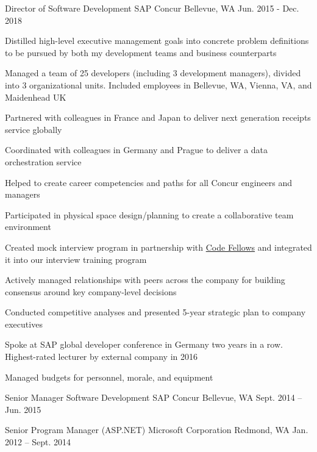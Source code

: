 \begin{cventries}

\cventry
{Director of Software Development}
{SAP Concur}
{Bellevue, WA}
{Jun. 2015 - Dec. 2018}
{
  \begin{cvitems}
  \item {Distilled high-level executive management goals into concrete problem definitions to be pursued by both my development teams and business counterparts}
  \item {Managed a team of 25 developers (including 3 development managers), divided into 3 organizational units. Included employees in Bellevue, WA, Vienna, VA, and Maidenhead UK}
  \item {Partnered with colleagues in France and Japan to deliver next generation receipts service globally}
  \item {Coordinated with colleagues in Germany and Prague to deliver a data orchestration service}
  \item {Helped to create career competencies and paths for all Concur engineers and managers}
  \item {Participated in physical space design/planning to create a collaborative team environment}
  \item {Created mock interview program in partnership with \href{https://www.codefellows.org/}{Code Fellows} and integrated it into our interview training program}
  \item {Actively managed relationships with peers across the company for building consensus around key company-level decisions}
  \item {Conducted competitive analyses and presented 5-year strategic plan to company executives}
  \item {Spoke at SAP global developer conference in Germany two years in a row. Highest-rated lecturer by external company in 2016}
  \item {Managed budgets for personnel, morale, and equipment}
  \end{cvitems}
}


\cventry
{Senior Manager Software Development}
{SAP Concur}
{Bellevue, WA}
{Sept. 2014 – Jun. 2015}
{}


\cventry 
{Senior Program Manager (ASP.NET)}
{Microsoft Corporation}
{Redmond, WA}
{Jan. 2012 – Sept. 2014}
{}


\end{cventries}
